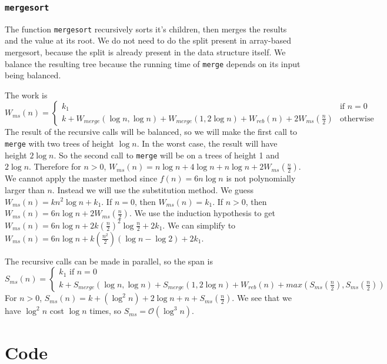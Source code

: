 \documentclass[12pt,letterpaper]{article}
\newcommand{\T}[1]{\texttt{#1}}
\begin{document}
\subsubsection{\T{mergesort}}
The function \T{mergesort} recursively sorts it's children, then merges the results and the value at its root. We do not need to do the split present in array-based mergesort, because the split is already present in the data structure itself.
We balance the resulting tree because the running time of \T{merge} depends on its input being balanced.

The work is
\[ W_{ms}(n) = 
  \begin{cases}
    k_1 & \text{if } n=0\\
    k + W_{merge}(\log n, \log n) + W_{merge}(1, 2\log n) + W_{reb}(n) + 2W_{ms}(\frac{n}{2}) &\text{otherwise}
  \end{cases}
\]
The result of the recursive calls will be balanced, so we will make the first call to \T{merge} with two trees of height $\log n$.
In the worst case, the result will have height $2\log n$.
So the second call to \T{merge} will be on a trees of height 1 and $2\log n$.
Therefore for $n>0$, $W_{ms}(n) = n\log n + 4\log n + n\log n + 2W_{ms}(\frac{n}{2})$.
We cannot apply the master method since $f(n) = 6n\log n$ is not polynomially larger than $n$.
Instead we will use the substitution method.
We guess $W_{ms}(n) = kn^2\log n + k_1$.
If $n=0$, then $W_{ms}(n) = k_1$.
If $n>0$, then $W_{ms}(n) = 6n\log n + 2W_{ms}(\frac{n}{2})$.
We use the induction hypothesis to get $W_{ms}(n) = 6n\log n + 2k(\frac{n}{2})^2\log\frac{n}{2} + 2k_1$.
We can simplify to $W_{ms}(n) = 6n\log n + k(\frac{n^2}{2})(\log n - \log 2) + 2k_1$.


The recursive calls can be made in parallel, so the span is
\[ S_{ms}(n) = 
  \begin{cases}
    k_1 \text{  if } n=0\\
    k + S_{merge}(\log n, \log n) + S_{merge}(1, 2\log n) + W_{reb}(n) + max(S_{ms}(\frac{n}{2}), S_{ms}(\frac{n}{2}))
  \end{cases}
\]
For $n>0$, $S_{ms}(n) = k + (\log^2 n) + 2\log n + n + S_{ms}(\frac{n}{2})$.
We see that we have $\log^2 n$ cost $\log n$ times, so $S_{ms} = \mathcal{O}(\log^3 n)$.


\section{Code}

\end{document}
